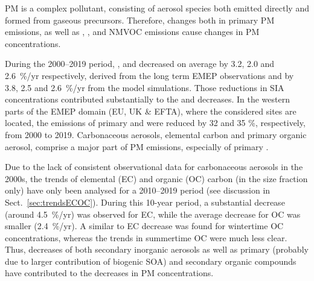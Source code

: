 
PM is a complex pollutant, consisting of aerosol species both emitted
directly and formed from gaseous precursors. Therefore, changes both in primary PM emissions, as well as \sox, \noii, \nhiii and NMVOC emissions cause changes in PM concentrations. 

During the 2000--2019 period, \soiv, \noii and \nhiv decreased on average by 3.2, 2.0 and 2.6~\%/yr respectively, derived from the long term EMEP observations and by 3.8, 2.5 and 2.6~\%/yr from the model simulations. Those reductions in SIA concentrations contributed substantially to the \PM[10] and \PM[2.5] decreases. In the western parts of the EMEP domain (EU, UK \& EFTA), where the considered sites are located, the emissions of primary \PM[10] and \PM[2.5] were reduced by 32 and 35 \%, respectively, from 2000 to 2019. Carbonaceous aerosols, elemental carbon and primary organic aerosol, comprise a major part of PM emissions, especially of primary \PM[2.5].


 
 Due to the lack of consistent observational data for carbonaceous aerosols in the 2000s, the trends of elemental (EC) and organic (OC) carbon (in the \PM[2.5] size fraction only) have only been analysed for a 2010--2019 period (see discussion in Sect.~\ref{sec:trendsECOC}). 
 During this 10-year period, a substantial decrease (around 4.5~\%/yr) was observed for EC, while the average decrease for OC was smaller (2.4~\%/yr). A similar to EC decrease was found for wintertime OC concentrations, whereas the trends in summertime OC were much less clear. Thus, decreases of both secondary inorganic aerosols as well as primary  (probably due to larger contribution of biogenic SOA) and secondary organic compounds have contributed to the decreases in PM concentrations.
 
